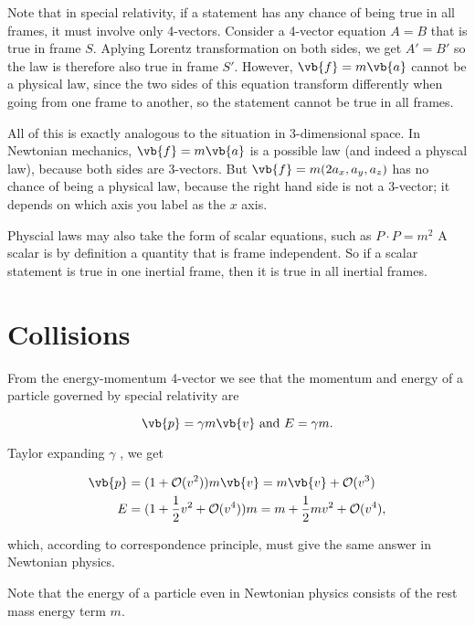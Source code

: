 \documentclass[english,a4paper,12pt]{report}
\begin{document}
Note that in special relativity, if a statement has any chance of being true in all frames, it must involve only 4-vectors. Consider a 4-vector equation \(A = B\) that is true in frame \(S\). Aplying Lorentz transformation on both sides, we get \(A' = B'\) so the law is therefore also true in frame \(S'\). However, \(\vb{f} = m\vb{a} \) cannot be a physical law, since the two sides of this equation transform differently when going from one frame to another, so the statement cannot be true in all frames. 

All of this is exactly analogous to the situation in 3-dimensional space. In Newtonian mechanics, \(\vb{f}  = m\vb{a} \) is a possible law (and indeed a physcal law), because both sides are 3-vectors. But \(\vb{f} = m(2a_{x}, a_{y},a_{z})\) has no chance of being a physical law, because the right hand side is not a 3-vector; it depends on which axis you label as the \(x\) axis.

Physcial laws may also take the form of scalar equations, such as \(P \cdot P = m^2\) A scalar is by definition a quantity that is frame independent. So if a scalar statement is true in one inertial frame, then it is true in all inertial frames.  

\section{Collisions}

From the energy-momentum 4-vector we see that the momentum and energy of a particle governed by special relativity are

\begin{equation}
    \vb{p}  = \gamma m\vb{v} \text { and } E = \gamma m.
\end{equation}

Taylor expanding \(\gamma \) , we get

\begin{equation}
    \begin{aligned}
    \vb{p} &= (1 + \mathcal{O}(v^2)) m\vb{v} = m\vb{v} + \mathcal{O}(v^3 ) \\
    E &= (1 + \frac{1}{2}v^2 + \mathcal{O}(v^{4} ) ) m = m + \frac{1}{2}mv^2 + \mathcal{O}(v^{4} ), 
    \end{aligned}
\end{equation}

which, according to correspondence principle, must give the same answer in Newtonian physics. 

Note that the energy of a particle even in Newtonian physics consists of the rest mass energy term \(m\).  
\end{document}
